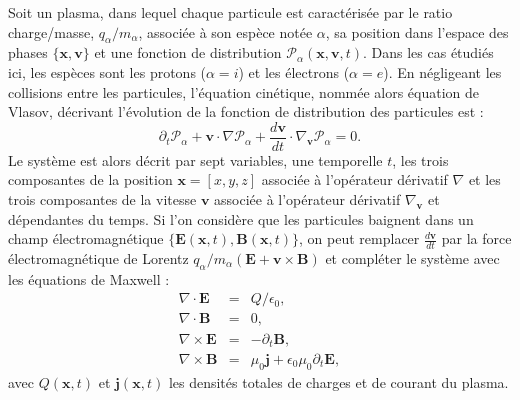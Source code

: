 Soit un plasma, dans lequel chaque particule est caractérisée par le ratio charge/masse, $q_{\alpha}/m_{\alpha}$, associée à son espèce notée $\alpha$, sa position dans l'espace des phases $\{\mathbf{x},\mathbf{v}\}$ et une fonction de distribution $\mathcal{P}_{\alpha}\left(\mathbf{x},\mathbf{v},t\right)$. Dans les cas étudiés ici, les espèces sont les protons ($\alpha = i$) et les électrons ($\alpha=e$). En négligeant les collisions entre les particules, l'équation cinétique, nommée alors équation de Vlasov, décrivant l'évolution de la fonction de distribution des particules est : 
\begin{equation}
\partial_t \mathcal{P}_{\alpha} +  \mathbf{v} \cdot \nabla \mathcal{P}_{\alpha} + \frac{d \mathbf{v}}{d t} \cdot \nabla_{\mathbf{v}}  \mathcal{P}_{\alpha}  = 0.
\label{kinetic vlasov}
\end{equation}
Le système est alors décrit par sept variables, une temporelle $t$, les trois composantes de la position $\mathbf{x}=\left[x,y,z\right]$ associée à l'opérateur dérivatif $\nabla$ et les trois composantes de la vitesse $\mathbf{v}$ associée à l'opérateur dérivatif $\nabla_{\mathbf{v}}$ et dépendantes du temps. Si l'on considère que les particules baignent dans un champ électromagnétique $\{\boldsymbol{E}\left(\mathbf{x},t\right),\boldsymbol{B}\left(\mathbf{x},t\right)\}$, on peut remplacer $\frac{d \mathbf{v}}{d t}$  par la force électromagnétique de Lorentz $q_{\alpha}/m_{\alpha} \left(\boldsymbol{E} + \mathbf{v} \times \boldsymbol{B}\right)$ et compléter le système avec les équations de Maxwell :
\begin{eqnarray}
    \label{eq:M1}\nabla \cdot \boldsymbol{E} &=& Q/\epsilon_0 ,\\
     \label{eq:M2}\nabla \cdot \boldsymbol{B} &=& 0 ,\\
     \label{eq:M3}\nabla \times \boldsymbol{E} &=& -\partial_t \boldsymbol{B} ,\\
     \label{eq:M4}\nabla \times \boldsymbol{B} &=& \mu_0 \boldsymbol{j} + \epsilon_0 \mu_0 \partial_t \boldsymbol{E} ,
\end{eqnarray}
avec $Q\left(\mathbf{x},t\right)$ et  $\boldsymbol{j}\left(\mathbf{x},t\right)$ les densités totales de charges et de courant du plasma. 

